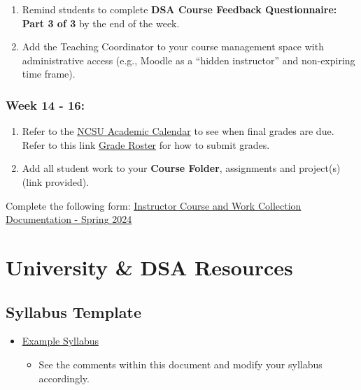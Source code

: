 \documentclass[
]{book}
\providecommand{\tightlist}{%
  \setlength{\itemsep}{0pt}\setlength{\parskip}{0pt}}
\begin{document}
\begin{enumerate}
\def\labelenumi{\arabic{enumi})}
\item
  Remind students to complete \textbf{DSA Course Feedback Questionnaire: Part 3 of 3} by the end of the week.
\item
  Add the Teaching Coordinator to your course management space with administrative access (e.g., Moodle as a ``hidden instructor'' and non-expiring time frame).
\end{enumerate}

\subsection{Week 14 - 16:}\label{week-14---16}

\begin{enumerate}
\def\labelenumi{\arabic{enumi})}
\item
  Refer to the \href{https://studentservices.ncsu.edu/calendars/academic/}{NCSU Academic Calendar} to see when final grades are due. Refer to this link \href{https://sis.emas.ncsu.edu/faculty/faculty-center/\#grades}{Grade Roster} for how to submit grades.
\item
  Add all student work to your \textbf{Course Folder}, assignments and project(s) (link provided).
\end{enumerate}

{ Complete the following form: } \href{https://docs.google.com/forms/d/e/1FAIpQLScV3CbK-M4OCDCSreFOG0X-7m--y73s5uXzyyWClMUWA0QTFA/viewform?usp=sf_link}{Instructor Course and Work Collection Documentation - Spring 2024}

\chapter{University \& DSA Resources}\label{university-dsa-resources}

\section{Syllabus Template}\label{syllabus-template}

\begin{itemize}
\tightlist
\item
  \href{https://docs.google.com/document/d/12w-byO3kEmP4ofI8GIuDAbXkEOA3hwqVGXz3qRbX-l4/edit?usp=sharing}{Example Syllabus}

  \begin{itemize}
  \tightlist
  \item
    See the comments within this document and modify your syllabus accordingly.
  \end{itemize}
\end{itemize}
\end{document}
